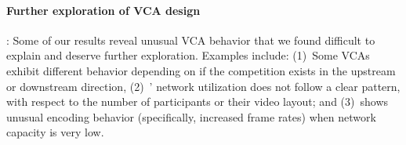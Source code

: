 \paragraph{Further exploration of VCA design}: Some of our results reveal
unusual VCA behavior that we found difficult to explain and deserve further
exploration. Examples include: (1)~Some VCAs exhibit different behavior
depending on if the competition exists in the upstream or downstream
direction, (2)~\teams' network utilization does not follow a clear pattern,
with respect to the number of participants or their video layout; and (3)~\meet shows unusual encoding behavior
(specifically, increased frame rates) when network capacity is very low.
